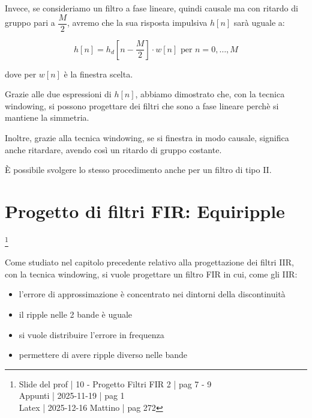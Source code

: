 Invece, se consideriamo un filtro a fase lineare, quindi causale ma con ritardo di gruppo pari a $\dfrac{M}{2}$, avremo che la sua risposta impulsiva $h \left[ n\right]$ sarà uguale a: 

{
    \Large 
    \begin{equation}
        h \left[ n\right] 
        = 
        h_d \left[ n - \dfrac{M}{2}\right] 
        \cdot 
        w \left[ n\right]
        \text{ per } 
        n = 0, \dots, M 
    \end{equation}
}

dove per $w \left[ n\right]$ è la finestra scelta. \newline 

Grazie alle due espressioni di $h \left[ n\right]$, abbiamo dimostrato che, con la tecnica windowing, si possono progettare dei filtri che sono a fase lineare perchè si mantiene la simmetria. \newline  

Inoltre, grazie alla tecnica windowing, se si finestra in modo causale, significa anche ritardare, avendo così un ritardo di gruppo costante. \newline 

È possibile svolgere lo stesso procedimento anche per un filtro di tipo II. \newline 

\newpage 

\section{Progetto di filtri FIR: Equiripple}

\footnote{ 
    Slide del prof | 10 - Progetto Filtri FIR 2 | pag 7 - 9\\
    Appunti | 2025-11-19 | pag 1 \\ 
    Latex | 2025-12-16 Mattino | pag 272 
}

Come studiato nel capitolo precedente relativo alla progettazione dei filtri IIR, 
con la tecnica windowing, si vuole progettare un filtro FIR in cui, come gli IIR: 

\begin{itemize}
    \item l'errore di approssimazione è concentrato nei dintorni della discontinuità 
    \item il ripple nelle 2 bande è uguale 
    \item si vuole distribuire l'errore in frequenza 
    \item permettere di avere ripple diverso nelle bande 
\end{itemize} 


